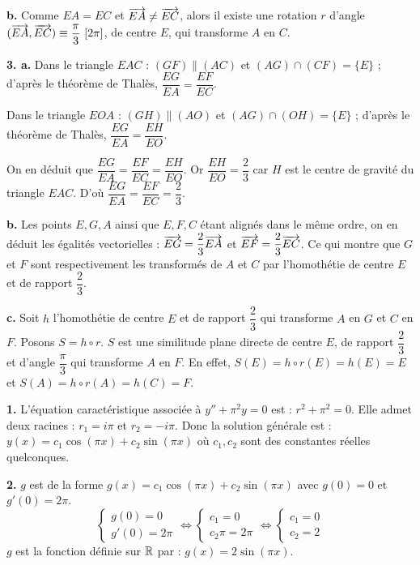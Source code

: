 \documentclass[11pt]{article}
\begin{document}
\textbf{b.} Comme $EA = EC$ et $\overrightarrow{EA} \ne \overrightarrow{EC}$, alors il existe une rotation $r$ d'angle $(\overrightarrow{EA}, \overrightarrow{EC}) \equiv \dfrac{\pi}{3}\ [2\pi]$, de centre $E$, qui transforme $A$ en $C$.

\textbf{3. a.} Dans le triangle $EAC$ : $(GF) \parallel (AC)$ et $(AG) \cap (CF) = \{E\}$ ; d'après le théorème de Thalès, $\dfrac{EG}{EA} = \dfrac{EF}{EC}$.

Dans le triangle $EOA$ : $(GH) \parallel (AO)$ et $(AG) \cap (OH) = \{E\}$ ; d'après le théorème de Thalès, $\dfrac{EG}{EA} = \dfrac{EH}{EO}$.

On en déduit que $\dfrac{EG}{EA} = \dfrac{EF}{EC} = \dfrac{EH}{EO}$. Or $\dfrac{EH}{EO} = \dfrac{2}{3}$ car $H$ est le centre de gravité du triangle $EAC$. D'où $\dfrac{EG}{EA} = \dfrac{EF}{EC} = \dfrac{2}{3}$.

\textbf{b.} Les points $E, G, A$ ainsi que $E, F, C$ étant alignés dans le même ordre, on en déduit les égalités vectorielles : $\overrightarrow{EG} = \dfrac{2}{3}\overrightarrow{EA}$ et $\overrightarrow{EF} = \dfrac{2}{3}\overrightarrow{EC}$. Ce qui montre que $G$ et $F$ sont respectivement les transformés de $A$ et $C$ par l'homothétie de centre $E$ et de rapport $\dfrac{2}{3}$.

\textbf{c.} Soit $h$ l'homothétie de centre $E$ et de rapport $\dfrac{2}{3}$ qui transforme $A$ en $G$ et $C$ en $F$. Posons $S = h \circ r$. $S$ est une similitude plane directe de centre $E$, de rapport $\dfrac{2}{3}$ et d'angle $\dfrac{\pi}{3}$ qui transforme $A$ en $F$. En effet, $S(E) = h \circ r(E) = h(E) = E$ et $S(A) = h \circ r(A) = h(C) = F$.

\prob{}

\textbf{1.} L'équation caractéristique associée à $y'' + \pi^2 y = 0$ est : $r^2 + \pi^2 = 0$. Elle admet deux racines : $r_1 = i\pi$ et $r_2 = -i\pi$. Donc la solution générale est : $y(x) = c_1\cos(\pi x) + c_2\sin(\pi x)$ où $c_1, c_2$ sont des constantes réelles quelconques.

\textbf{2.} $g$ est de la forme $g(x) = c_1\cos(\pi x) + c_2\sin(\pi x)$ avec $g(0) = 0$ et $g'(0) = 2\pi$.
\[ \begin{cases} g(0) = 0 \\ g'(0) = 2\pi \end{cases} \Longleftrightarrow \begin{cases} c_1 = 0 \\ c_2\pi = 2\pi \end{cases} \Longleftrightarrow \begin{cases} c_1 = 0 \\ c_2 = 2 \end{cases} \]
$g$ est la fonction définie sur $\mathbb{R}$ par : $g(x) = 2\sin(\pi x)$.
\end{document}
